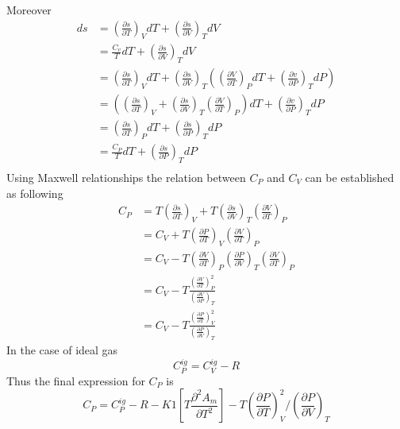 \documentclass[11pt]{article}
\begin{document}
\begin{enumerate}
\begin{equation}
\end{equation}
Moreover 
\begin{align}
ds &= \left(\frac{\partial s}{\partial T}\right)_{V} dT + \left(\frac{\partial s}{\partial V}\right)_{T} dV \\
   &= \frac{C_{v}}{T} dT + \left(\frac{\partial s}{\partial V}\right)_{T} dV \\
   &= \left(\frac{\partial s}{\partial T}\right)_{V} dT + \left(\frac{\partial s}{\partial V}\right)_{T} \left( \left(\frac{\partial V}{\partial T}\right)_{P} dT + \left(\frac{\partial v}{\partial P} \right)_{T} dP \right)\\
   &= \left(\left(\frac{\partial s}{\partial T}\right)_{V} + \left(\frac{\partial s}{\partial V}\right)_{T} \left(\frac{\partial V}{\partial T}\right)_{P} \right)dT + \left(\frac{\partial v}{\partial P} \right)_{T} dP \\
   &= \left(\frac{\partial s}{\partial T}\right)_{P} dT + \left(\frac{\partial s}{\partial P}\right)_{T} dP \\
   &= \frac{C_{P}}{T} dT + \left(\frac{\partial s}{\partial P}\right)_{T} dP \\
\end{align}
Using Maxwell relationships the relation between $C_{P}$ and $C_{V}$ can be established as following 
\begin{align}
C_{P} & = T\left(\frac{\partial s}{\partial T} \right)_{V} + T \left(\frac{\partial s}{\partial V} \right)_{T} \left(\frac{\partial V}{\partial T} \right)_{P} \\
      & = C_{V} + T \left(\frac{\partial P}{\partial T} \right)_{V} \left(\frac{\partial V}{\partial T} \right)_{P} \\
      & = C_{V} - T \left(\frac{\partial V}{\partial T} \right)_{P} \left(\frac{\partial P}{\partial V} \right)_{T} \left(\frac{\partial V}{\partial T} \right)_{P} \\
      & = C_{V} - T\frac{\left(\frac{\partial V}{\partial T} \right)_{P}^{2}}{\left(\frac{\partial V}{\partial P} \right)_{T}} \\
      & = C_{V} - T\frac{\left(\frac{\partial P}{\partial T} \right)_{V}^{2}}{\left(\frac{\partial P}{\partial V} \right)_{T}} 
      \label{eq:CpCvReal}
\end{align}
In the case of ideal gas 
\begin{equation}
C_{P}^{ig} = C_{V}^{ig} - R
\end{equation}
Thus the final expression for $C_{P}$ is 
\begin{equation}
C_{P} = C_{P}^{ig} -R -K1 \left[T \frac{\partial^{2} A_{m}}{\partial T^{2}} \right] - T\left(\frac{\partial P}{\partial T}\right)^{2}_{V}/ \left(\frac{\partial P}{\partial V}\right)_{T}
\label{eq:CpRelation}
\end{equation}
\end{enumerate}
\end{document}
